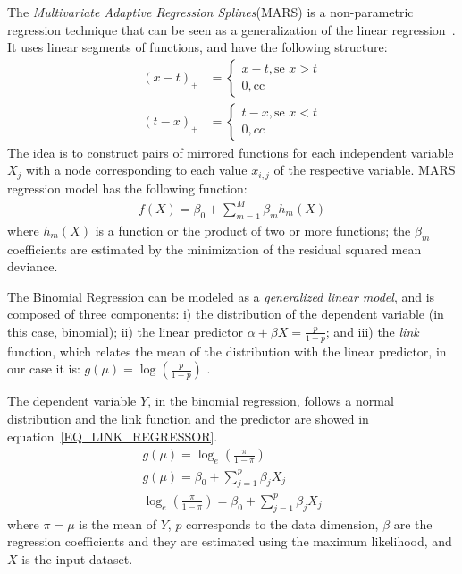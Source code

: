 \documentclass{sig-alternate-05-2015}
\begin{document}
The \emph{Multivariate Adaptive Regression Splines}(MARS) is a non-parametric regression technique that can be seen as a generalization of the linear regression~\cite{Hastie2009}. It uses linear segments of functions, and have the following structure:
\begin{align}
(x-t)_{+} &= \begin{cases}
x-t, \mbox{se } x>t \\
0,   \mbox{cc}
\end{cases}
\\
(t-x)_{+} &= \begin{cases}
t-x, \mbox{se } x<t \\
0, cc
\end{cases} 
\end{align}
The idea is to construct pairs of mirrored functions for each independent variable \(X_{j}\) with a node corresponding to each value \(x_{i,j}\) of the respective variable. MARS regression model has the following function:
\begin{align}
f(X) = \beta_{0} + \sum\limits_{m=1}^{M}\beta_{m}h_{m}(X)
\end{align}
where \(h_{m}(X)\) is a function or the product of two or more functions; the \(\beta_{m}\) coefficients are estimated by the minimization of the residual squared mean deviance.

The Binomial Regression can be modeled as a \emph{generalized linear model}, and is composed of three components: i) the distribution of the dependent variable (in this case, binomial); ii) the linear predictor \(\alpha + \beta X = \frac{p}{1 - p} \); and iii) the \emph{link} function, which relates the mean of the distribution with the linear predictor, in our case it is: \(g(\mu) = \log(\frac{p}{1-p})\) \cite{Hastie2009}.

The dependent variable \(Y\), in the binomial regression, follows a normal distribution and the link function and the predictor are showed in equation~\eqref{EQ_LINK_REGRESSOR}.
\begin{align}
g(\mu) = \log_{e}\left( \frac{\pi}{1-\pi}\right) \\
g(\mu) = \beta_{0} + \sum\limits_{j=1}^{p} \beta_{j}X_{j} \\
\log_{e}\left( \frac{\pi}{1-\pi}\right)= \beta_{0} + \sum\limits_{j=1}^{p} \beta_{j}X_{j} \label{EQ_LINK_REGRESSOR}
\end{align}
where \(\pi = \mu\) is the mean of \(Y\), \(p\) corresponds to the data dimension, \(\beta\) are the regression coefficients and they are estimated using the maximum likelihood, and \(X\) is the input dataset.
\end{document}
